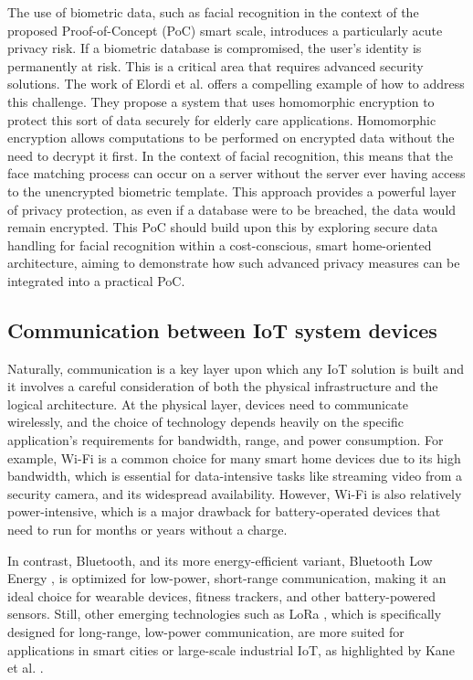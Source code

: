\documentclass[12pt]{article}
\begin{document}
The use of biometric data, such as facial recognition in the context of the proposed Proof-of-Concept (PoC) smart scale, introduces a particularly acute privacy risk. If a biometric database is compromised, the user's identity is permanently at risk. This is a critical area that requires advanced security solutions. The work of Elordi et al. \cite{elordi2021optimal} offers a compelling example of how to address this challenge. They propose a system that uses homomorphic encryption to protect this sort of data securely for elderly care applications. Homomorphic encryption allows computations to be performed on encrypted data without the need to decrypt it first. In the context of facial recognition, this means that the face matching process can occur on a server without the server ever having access to the unencrypted biometric template. This approach provides a powerful layer of privacy protection, as even if a database were to be breached, the data would remain encrypted. This PoC should build upon this by exploring secure data handling for facial recognition within a cost-conscious, smart home-oriented architecture, aiming to demonstrate how such advanced privacy measures can be integrated into a practical PoC.

\subsection{Communication between IoT system devices}

Naturally, communication is a key layer upon which any IoT solution is built and it involves a careful consideration of both the physical infrastructure and the logical architecture. At the physical layer, devices need to communicate wirelessly, and the choice of technology depends heavily on the specific application's requirements for bandwidth, range, and power consumption. For example, Wi-Fi is a common choice for many smart home devices due to its high bandwidth, which is essential for data-intensive tasks like streaming video from a security camera, and its widespread availability. However, Wi-Fi is also relatively power-intensive, which is a major drawback for battery-operated devices that need to run for months or years without a charge. 

In contrast, Bluetooth, and its more energy-efficient variant, Bluetooth Low Energy \cite{bluetooth}, is optimized for low-power, short-range communication, making it an ideal choice for wearable devices, fitness trackers, and other battery-powered sensors. Still, other emerging technologies such as LoRa \cite{lora}, which is specifically designed for long-range, low-power communication, are more suited for applications in smart cities or large-scale industrial IoT, as highlighted by Kane et al. \cite{kane2022lora}. 
\end{document}
